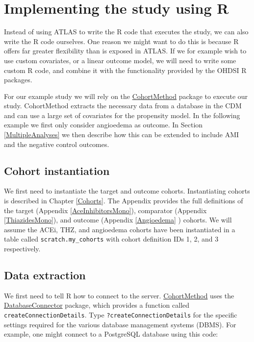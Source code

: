 \documentclass[11pt]{book}
\theoremstyle{definition}
\theoremstyle{definition}
\theoremstyle{definition}
\theoremstyle{remark}
\begin{document}
\hypertarget{pleR}{%
\section{Implementing the study using R}\label{pleR}}

Instead of using ATLAS to write the R code that executes the study, we can also write the R code ourselves. One reason we might want to do this is because R offers far greater flexibility than is exposed in ATLAS. If we for example wish to use custom covariates, or a linear outcome model, we will need to write some custom R code, and combine it with the functionality provided by the OHDSI R packages.

For our example study we will rely on the \href{https://ohdsi.github.io/CohortMethod/}{CohortMethod} package to execute our study. CohortMethod extracts the necessary data from a database in the CDM and can use a large set of covariates for the propensity model. In the following example we first only consider angioedema as outcome. In Section \ref{MultipleAnalyses} we then describe how this can be extended to include AMI and the negative control outcomes.

\hypertarget{cohort-instantiation-1}{%
\subsection{Cohort instantiation}\label{cohort-instantiation-1}}

We first need to instantiate the target and outcome cohorts. Instantiating cohorts is described in Chapter \ref{Cohorts}. The Appendix provides the full definitions of the target (Appendix \ref{AceInhibitorsMono}), comparator (Appendix \ref{ThiazidesMono}), and outcome (Appendix \ref{Angioedema} ) cohorts. We will assume the ACEi, THZ, and angioedema cohorts have been instantiated in a table called \texttt{scratch.my\_cohorts} with cohort definition IDs 1, 2, and 3 respectively.

\hypertarget{data-extraction-1}{%
\subsection{Data extraction}\label{data-extraction-1}}

We first need to tell R how to connect to the server. \href{https://ohdsi.github.io/CohortMethod/}{CohortMethod} uses the \href{https://ohdsi.github.io/DatabaseConnector/}{DatabaseConnector} package, which provides a function called \texttt{createConnectionDetails}. Type \texttt{?createConnectionDetails} for the specific settings required for the various database management systems (DBMS). For example, one might connect to a PostgreSQL database using this code:
\end{document}
